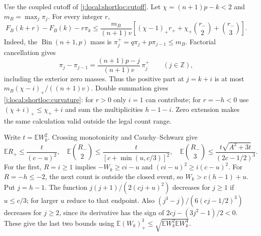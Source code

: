 Use the coupled cutoff of \eqref{j:local:shortloc:cutoff}.
Let $\chi=(n+1)p-k<2$ and $m_B=\max_j\pi_j$. For every integer $r$,
\begin{equation}\label{j:local:shortloc:curvature}
 F_B(k+r)-F_B(k)-r\pi_k\le\frac{m_B}{(n+1)v}
 \left[(\chi-1)_+r_++\chi_+\binom{r_-}{2}+\binom{r_-}{3}\right].
\end{equation}
Indeed, the $\operatorname{Bin}(n+1,p)$ mass is
$\pi_j^+=q\pi_j+p\pi_{j-1}\le m_B$. Factorial cancellation gives
\[
 \pi_j-\pi_{j-1}=\frac{(n+1)p-j}{(n+1)v}\,\pi_j^+
 \qquad(j\in\mathbb Z),
\]
including the exterior zero masses. Thus the positive part at $j=k+i$
is at most $m_B(\chi-i)_+/((n+1)v)$.
Double summation gives \eqref{j:local:shortloc:curvature}: for $r>0$ only $i=1$
can contribute; for $r=-h<0$ use $(\chi+i)_+\le\chi_++i$ and sum the
multiplicities $h-1-i$. Zero extension makes the same calculation valid
outside the legal count range.

Write $t=\mathbb EW_k^2$. Crossing monotonicity and Cauchy--Schwarz give
\begin{equation}\label{j:local:shortloc:crossingmoments}
 \mathbb ER_+\le\frac{t}{(c-u)^2},\quad
 \mathbb E\binom{R_-}{2}\le\frac{t}{[c+\min(u,c/3)]^2},\quad
 \mathbb E\binom{R_-}{3}\le\frac{t\sqrt{A^2+3t}}{(2c-1/2)^3}.
\end{equation}
For the first, $R=i\ge1$ implies $-W_k\ge ci-u$ and
$(ci-u)^2\ge i(c-u)^2$. For $R=-h\le-2$, the next count is outside the
closed event, so $W_k>c(h-1)+u$. Put $j=h-1$.
The function $j(j+1)/(2(cj+u)^2)$ decreases for $j\ge1$ if $u\le c/3$;
for larger $u$ reduce to that endpoint. Also
$(j^3-j)/(6(cj-1/2)^3)$ decreases for $j\ge2$, since its derivative has
the sign of $2cj-(3j^2-1)/2<0$. These give the last two bounds using
$\mathbb E(W_k)_+^3\le\sqrt{\mathbb EW_k^2\mathbb EW_k^4}$.

